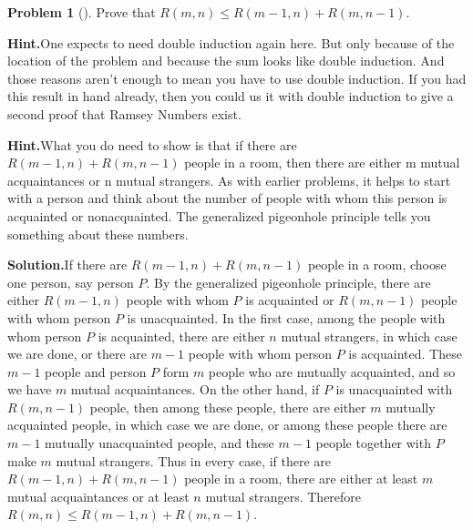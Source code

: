 \documentclass[10pt,]{book}
\theoremstyle{plain}
\theoremstyle{definition}
\newtheorem{activity}[project]{Problem}
\theoremstyle{definition}
\numberwithin{equation}{chapter}
\begin{document}
\begin{activity}[]\label{Ramseyrecurrence}
Prove that \(R(m,n)\le R(m-1,n) + R(m,n-1)\).%
\par\medskip\noindent%
\textbf{Hint.}\quad One expects to need double induction again here. But only because of the location of the problem and because the sum looks like double induction. And those reasons aren't enough to mean you have to use double induction. If you had this result in hand already, then you could us it with double induction to give a second proof that Ramsey Numbers exist.%
\par\medskip\noindent%
\textbf{Hint.}\quad What you do need to show is that if there are \(R(m - 1, n) + R(m, n - 1)\) people in a room, then there are either m mutual acquaintances or n mutual strangers. As with earlier problems, it helps to start with a person and think about the number of people with whom this person is acquainted or nonacquainted. The generalized pigeonhole principle tells you something about these numbers.%
\par\medskip\noindent%
\textbf{Solution.}\quad If there are \(R(m-1,n) +R(m,n-1)\) people in a room, choose one person, say person \(P\). By the generalized pigeonhole principle, there are either \(R(m-1,n)\) people with whom \(P\) is acquainted or \(R(m,n-1)\) people with whom person \(P\) is unacquainted. In the first case, among the people with whom person \(P\) is acquainted, there are either \(n\) mutual strangers, in which case we are done, or there are \(m-1\) people with whom person \(P\) is acquainted. These \(m-1\) people and person \(P\) form \(m\) people who are mutually acquainted, and so we have \(m\) mutual acquaintances. On the other hand, if \(P\) is unacquainted with \(R(m,n-1)\) people, then among these people, there are either \(m\) mutually acquainted people, in which case we are done, or among these people there are \(m-1\) mutually unacquainted people, and these \(m-1\) people together with \(P\) make \(m\) mutual strangers. Thus in every case, if there are \(R(m-1,n)+R(m,n-1)\) people in a room, there are either at least \(m\) mutual acquaintances or at least \(n\) mutual strangers. Therefore \(R(m,n)\le
R(m-1,n)+R(m,n-1)\).%
\end{activity}
\end{document}
